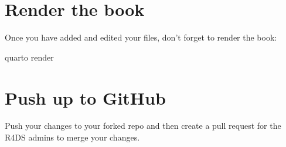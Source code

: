 \documentclass[
  letterpaper,
  DIV=11,
  numbers=noendperiod]{scrreprt}
\newenvironment{Shaded}{\begin{snugshade}}{\end{snugshade}}
\newcommand{\ExtensionTok}[1]{\textcolor[rgb]{0.00,0.48,0.65}{#1}}
\newcommand{\NormalTok}[1]{\textcolor[rgb]{0.00,0.48,0.65}{#1}}
\begin{document}
\hypertarget{render-the-book}{%
\section*{Render the book}\label{render-the-book}}

Once you have added and edited your files, don't forget to render the
book:

\begin{Shaded}
\begin{Highlighting}[]
\ExtensionTok{quarto}\NormalTok{ render}
\end{Highlighting}
\end{Shaded}

\hypertarget{push-up-to-github}{%
\section*{Push up to GitHub}\label{push-up-to-github}}

Push your changes to your forked repo and then create a pull request for
the R4DS admins to merge your changes.
\end{document}

